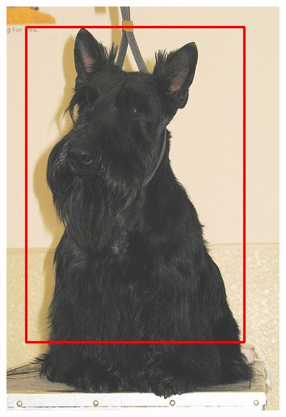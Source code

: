 \documentclass[conference,compsoc]{IEEEtran}
\begin{document}
\begin{figure}
\begin{multicols}{4}
    		\includegraphics[height=1.35\linewidth]{good3.jpg}\par 

\end{multicols}
\end{figure}
\end{document}
